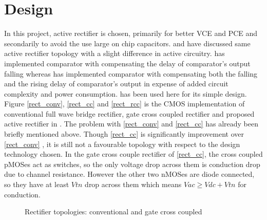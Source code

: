 \documentclass[UKenglish]{ifimaster}  %
\begin{document}
\section{Design}	%

In this project, active rectifier is chosen, primarily for better VCE and PCE and secondarily to avoid the use large on chip capacitors. \cite{rectrcc}  and \cite{rectcomp} have discussed same active rectifier topology with a slight difference in active circuitry. \cite{rectrcc} has implemented comparator with compensating the delay of comparator's output falling whereas \cite{rectcomp} has implemented comparator with compensating both the falling and the rising delay of comparator's output in expense of added circuit complexity and power consumption. \cite{rectrcc} has been used here for its simple design. \\

Figure \ref{rect_conv}, \ref{rect_cc} and \ref{rect_rcc} is the CMOS implementation of conventional full wave bridge rectifier, gate cross coupled rectifier and proposed active rectifier in \cite{rectrcc}. The problem with \ref{rect_conv} and \ref{rect_cc} has already been briefly mentioned above. Though  \ref{rect_cc}  is significantly improvement over  \ref{rect_conv} , it is still not a favourable topology with respect to the design technology chosen. In the gate cross couple rectifier of  \ref{rect_cc}, the cross coupled pMOSes act as switches, so the only voltage drop across them is conduction drop due to channel resistance. However the other two nMOSes are diode connected, so they have at least $Vtn$ drop across them which means $Vac \geq Vdc + Vtn$ for conduction. \\

\begin{figure} [htbp]
  \centering 
\hfill
 \caption{Rectifier topologies: conventional and gate cross coupled} 
\label{rect_conv_cc} 
\end{figure}
\end{document}
